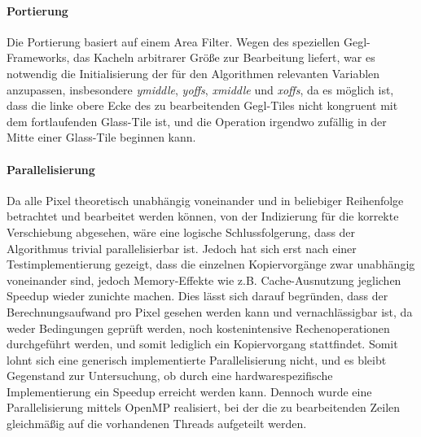 \paragraph{Portierung}
Die Portierung basiert auf einem Area Filter. Wegen des speziellen Gegl-Frameworks, das Kacheln arbitrarer Größe zur Bearbeitung liefert, war es notwendig die Initialisierung der für den Algorithmen relevanten Variablen anzupassen, insbesondere \emph{ymiddle}, \emph{yoffs}, \emph{xmiddle} und \emph{xoffs}, da es möglich ist, dass die linke obere Ecke des zu bearbeitenden Gegl-Tiles nicht kongruent mit dem fortlaufenden Glass-Tile ist, und die Operation irgendwo zufällig in der Mitte einer Glass-Tile beginnen kann.

\paragraph{Parallelisierung}
Da alle Pixel theoretisch unabhängig voneinander und in beliebiger Reihenfolge betrachtet und bearbeitet werden können, von der Indizierung für die korrekte Verschiebung abgesehen, wäre eine logische Schlussfolgerung, dass der Algorithmus trivial parallelisierbar ist. Jedoch hat sich erst nach einer Testimplementierung gezeigt, dass die einzelnen Kopiervorgänge zwar unabhängig voneinander sind, jedoch Memory-Effekte wie z.B. Cache-Ausnutzung jeglichen Speedup wieder zunichte machen. Dies lässt sich darauf begründen, dass der Berechnungsaufwand pro Pixel gesehen werden kann und vernachlässigbar ist, da weder Bedingungen geprüft werden, noch kostenintensive Rechenoperationen durchgeführt werden, und somit lediglich ein Kopiervorgang stattfindet. Somit lohnt sich eine generisch implementierte Parallelisierung nicht, und es bleibt Gegenstand zur Untersuchung, ob durch eine hardwarespezifische Implementierung ein Speedup erreicht werden kann.\newline
Dennoch wurde eine Parallelisierung mittels OpenMP realisiert, bei der die zu bearbeitenden Zeilen gleichmäßig auf die vorhandenen Threads aufgeteilt werden.